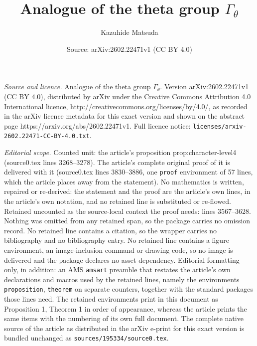 \documentclass[10pt,a4paper]{amsart}
\title{Analogue of the theta group $\Gamma_{\theta}$}
\author{Kazuhide Matsuda}
\date{Source: arXiv:2602.22471v1 (CC BY 4.0)}
\begin{document}
\maketitle

\noindent\emph{Source and licence.} Analogue of the theta group $\Gamma_{\theta}$. Version arXiv:2602.22471v1 (CC BY 4.0), distributed by arXiv under the Creative Commons Attribution 4.0 International licence, http://creativecommons.org/licenses/by/4.0/, as recorded in the arXiv licence metadata for this exact version and shown on the abstract page https://arxiv.org/abs/2602.22471v1. Full licence notice: \texttt{licenses/arxiv-2602.22471-CC-BY-4.0.txt}.\par\smallskip

\noindent\textit{Editorial scope.} Counted unit: the article's proposition prop:character-level4 (source0.tex lines 3268--3278). The article's complete original proof of it is delivered with it (source0.tex lines 3830--3886, one \texttt{proof} environment of 57 lines, which the article places away from the statement). No mathematics is written, repaired or re-derived: the statement and the proof are the article's own lines, in the article's own notation, and no retained line is substituted or re-flowed.  Retained uncounted as the source-local context the proof needs: lines 3567--3628.  Nothing was omitted from any retained span, so the package carries no omission record.  No retained line contains a citation, so the wrapper carries no bibliography and no bibliography entry.  No retained line contains a figure environment, an image-inclusion command or drawing code, so no image is delivered and the package declares no asset dependency.  Editorial formatting only, in addition: an AMS \texttt{amsart} preamble that restates the article's own declarations and macros used by the retained lines, namely the environments \texttt{proposition}, \texttt{theorem} on separate counters, together with the standard packages those lines need.  The retained environments print in this document as Proposition 1, Theorem 1 in order of appearance, whereas the article prints the same items with the numbering of its own full document.  The complete native source of the article as distributed in the arXiv e-print for this exact version is bundled unchanged as \texttt{sources/195334/source0.tex}.
\end{document}
